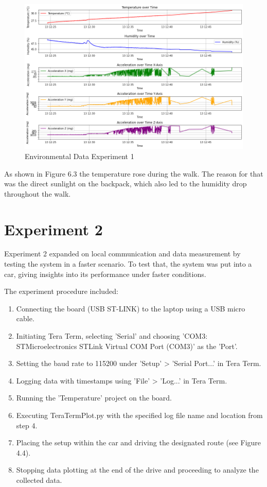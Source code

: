 \begin{figure}[H]
\centering
\includegraphics[width=1\linewidth]{plot_exp_1.png}
\caption{Environmental Data Experiment 1}
\label{fig:Environmental Data Experiment 1}
\end{figure}

As shown in Figure 6.3 the temperature rose during the walk. The reason for that was the direct sunlight on the backpack, which also led to the humidity drop throughout the walk.

\section{Experiment 2}

Experiment 2 expanded on local communication and data measurement by testing the system in a faster scenario. To test that, the system was put into a car, giving insights into its performance under faster conditions.

The experiment procedure included:

\begin{enumerate}
\item Connecting the board (USB ST-LINK) to the laptop using a USB micro cable.
\item Initiating Tera Term, selecting 'Serial' and choosing 'COM3: STMicroelectronics STLink Virtual COM Port (COM3)' as the 'Port'.
\item Setting the baud rate to 115200 under 'Setup' > 'Serial Port...' in Tera Term.
\item Logging data with timestamps using 'File' > 'Log...' in Tera Term.
\item Running the 'Temperature' project on the board.
\item Executing TeraTermPlot.py with the specified log file name and location from step 4.
\item Placing the setup within the car and driving the designated route (see Figure 4.4).
\item Stopping data plotting at the end of the drive and proceeding to analyze the collected data.
\end{enumerate}

